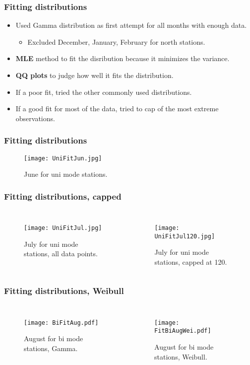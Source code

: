 \documentclass{beamer}
\begin{document}
\begin{frame}
\frametitle{Fitting distributions}
\begin{itemize}
	\item Used Gamma distribution as first attempt for all months with enough data.
	\begin{itemize}
		\item Excluded December, January, February for north stations.	
	\end{itemize}
	\item \textbf{MLE} method to fit the disribution because it minimizes the variance.
	\item \textbf{QQ plots} to judge how well it fits the distribution.
	\item If a poor fit, tried the other commonly used distributions.
	\item If a good fit for most of the data, tried to cap of the most extreme observations.
\end{itemize}
\end{frame}

\begin{frame}
\frametitle{Fitting distributions}
\begin{figure}
	\texttt{[image: UniFitJun.jpg]}
	\caption{June for uni mode stations.}
\end{figure}
\end{frame}

\begin{frame}
\frametitle{Fitting distributions, capped}
\begin{columns}
\begin{figure}
	\texttt{[image: UniFitJul.jpg]}
	\caption{July for uni mode stations, all data points.}
\end{figure}
\begin{figure}
	\texttt{[image: UniFitJul120.jpg]}
	\caption{July for uni mode stations, capped at 120.}
\end{figure}
\end{columns}
\end{frame}

\begin{frame}
\frametitle{Fitting distributions, Weibull}
\begin{columns}
\begin{figure}
	\texttt{[image: BiFitAug.pdf]}
	\caption{August for bi mode stations, Gamma.}
\end{figure}
\begin{figure}
	\texttt{[image: FitBiAugWei.pdf]}
	\caption{August for bi mode stations, Weibull.}
\end{figure}
\end{columns}
\end{frame}
\end{document}
